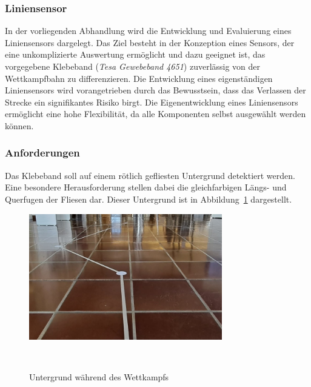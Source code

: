 \documentclass[main.tex]{subfiles} %
\begin{document}

\subsubsection{Liniensensor}

In der vorliegenden Abhandlung wird die Entwicklung und Evaluierung eines 
Liniensensors dargelegt. Das Ziel besteht in der Konzeption eines Sensors, 
der eine unkomplizierte Auswertung ermöglicht und dazu geeignet ist, das 
vorgegebene Klebeband (\textit{Tesa Gewebeband 4651}) zuverlässig von der Wettkampfbahn 
zu differenzieren. Die Entwicklung eines eigenständigen Liniensensors wird 
vorangetrieben durch das Bewusstsein, dass das Verlassen der Strecke ein 
signifikantes Risiko birgt. Die Eigenentwicklung eines Liniensensors ermöglicht 
eine hohe Flexibilität, da alle Komponenten selbst ausgewählt werden können.

\subsubsection*{Anforderungen}

Das Klebeband soll auf einem rötlich gefliesten Untergrund 
detektiert werden. Eine besondere Herausforderung stellen 
dabei die gleichfarbigen Längs- und Querfugen der Fliesen dar. 
Dieser Untergrund ist in Abbildung~\ref{fig:Untergrund_Wettkampf} 
dargestellt.

\begin{figure}[H]
    \centering
    \includegraphics[width=0.75\textwidth]{fig_Strecke_Tracken/Bild_Untergrund.jpg}
    \caption{Untergrund während des Wettkampfs}~\label{fig:Untergrund_Wettkampf}
\end{figure}

\end{document}
